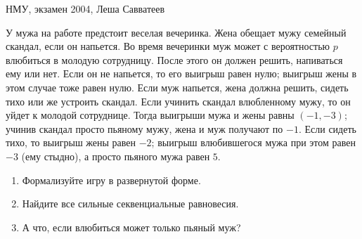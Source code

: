 \begin{problem}\begin{source}
НМУ, экзамен 2004, Леша Савватеев
\end{source}
 У мужа на работе предстоит веселая вечеринка. Жена обещает мужу семейный скандал, если он напьется. Во время вечеринки муж может с вероятностью $p$ влюбиться в молодую сотрудницу. После этого он должен решить, напиваться ему или нет. Если он не напьется, то его выигрыш равен нулю; выигрыш жены в этом случае тоже равен нулю.
Если муж напьется, жена должна решить, сидеть тихо или же устроить скандал. Если учинить скандал влюбленному мужу, то он уйдет к молодой сотруднице. Тогда выигрыши мужа и жены равны $(-1,-3)$; учинив скандал просто пьяному мужу, жена и муж получают по $-1$. Если сидеть тихо, то выигрыш жены равен $-2$; выигрыш влюбившегося мужа при этом равен $-3$ (ему стыдно), а просто пьяного мужа равен $5$.
\begin{enumerate}
\item Формализуйте игру в развернутой форме.
\item Найдите все сильные секвенциальные равновесия.
\item А что, если влюбиться может только пьяный муж?
\end{enumerate}






\begin{sol}

\end{sol}
\end{problem}






